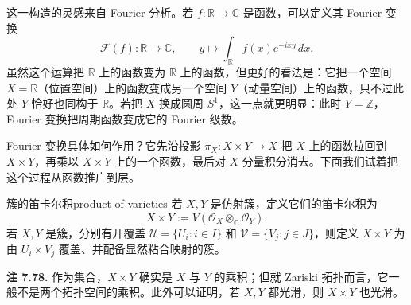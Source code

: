 这一构造的灵感来自 Fourier 分析。若 $f\colon\mathbb R\to\mathbb C$ 是函数，可以定义其 Fourier 变换
\[
  \mathcal F(f)\colon\mathbb R\to\mathbb C,
  \qquad y\longmapsto\int_{\mathbb R}f(x)e^{-ixy}\,dx.
\]
虽然这个运算把 $\mathbb R$ 上的函数变为 $\mathbb R$ 上的函数，但更好的看法是：它把一个空间 $X=\mathbb R$（位置空间）上的函数变成另一个空间 $Y$（动量空间）上的函数，只不过此处 $Y$ 恰好也同构于 $\mathbb R$。若把 $X$ 换成圆周 $S^1$，这一点就更明显：此时 $Y=\mathbb Z$，Fourier 变换把周期函数变成它的 Fourier 级数。

Fourier 变换具体如何作用？它先沿投影 $\pi_X\colon X\times Y\to X$ 把 $X$ 上的函数拉回到 $X\times Y$，再乘以 $X\times Y$ 上的一个函数，最后对 $X$ 分量积分消去。下面我们试着把这个过程从函数推广到层。

\begin{definition}{簇的笛卡尔积}{product-of-varieties}
若 $X,Y$ 是仿射簇，定义它们的笛卡尔积为
\[
  X\times Y:=V(\mathcal O_X\otimes_{\mathbb C}\mathcal O_Y).
\]
若 $X,Y$ 是簇，分别有开覆盖 $\mathcal U=\{U_i:i\in I\}$ 和 $\mathcal V=\{V_j:j\in J\}$，则定义 $X\times Y$ 为由 $U_i\times V_j$ 覆盖、并配备显然粘合映射的簇。
\end{definition}

\begin{note}\label{note:product-topology-varieties}
\textbf{注 7.78.} 作为集合，$X\times Y$ 确实是 $X$ 与 $Y$ 的乘积；但就 Zariski 拓扑而言，它一般不是两个拓扑空间的乘积。此外可以证明，若 $X,Y$ 都光滑，则 $X\times Y$ 也光滑。
\end{note}

